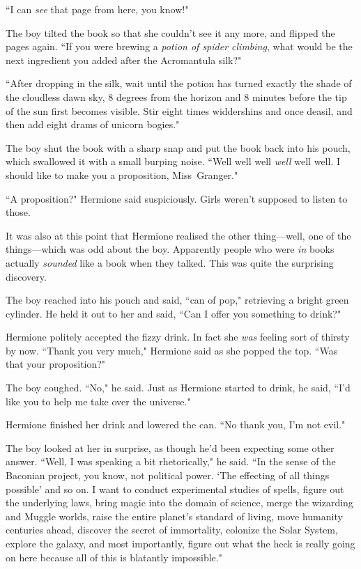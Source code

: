 ``I can \emph{see} that page from here, you know!"

The boy tilted the book so that she couldn't see it any more, and flipped the pages again. ``If you were brewing a \emph{potion of spider climbing}, what would be the next ingredient you added after the Acromantula silk?"

``After dropping in the silk, wait until the potion has turned exactly the shade of the cloudless dawn sky, 8 degrees from the horizon and 8 minutes before the tip of the sun first becomes visible. Stir eight times widdershins and once deasil, and then add eight drams of unicorn bogies."

The boy shut the book with a sharp snap and put the book back into his pouch, which swallowed it with a small burping noise. ``Well well well \emph{well} well well. I should like to make you a proposition, Miss~Granger."

``A proposition?" Hermione said suspiciously. Girls weren't supposed to listen to those.

It was also at this point that Hermione realised the other thing—well, one of the things—which was odd about the boy. Apparently people who were \emph{in} books actually \emph{sounded} like a book when they talked. This was quite the surprising discovery.

The boy reached into his pouch and said, ``can of pop," retrieving a bright green cylinder. He held it out to her and said, ``Can I offer you something to drink?"

Hermione politely accepted the fizzy drink. In fact she \emph{was} feeling sort of thirsty by now. ``Thank you very much," Hermione said as she popped the top. ``Was that your proposition?"

The boy coughed. ``No," he said. Just as Hermione started to drink, he said, ``I'd like you to help me take over the universe."

Hermione finished her drink and lowered the can. ``No thank you, I'm not evil."

The boy looked at her in surprise, as though he'd been expecting some other answer. ``Well, I was speaking a bit rhetorically," he said. ``In the sense of the Baconian project, you know, not political power. `The effecting of all things possible' and so on. I want to conduct experimental studies of spells, figure out the underlying laws, bring magic into the domain of science, merge the wizarding and Muggle worlds, raise the entire planet's standard of living, move humanity centuries ahead, discover the secret of immortality, colonize the Solar System, explore the galaxy, and most importantly, figure out what the heck is really going on here because all of this is blatantly impossible."

